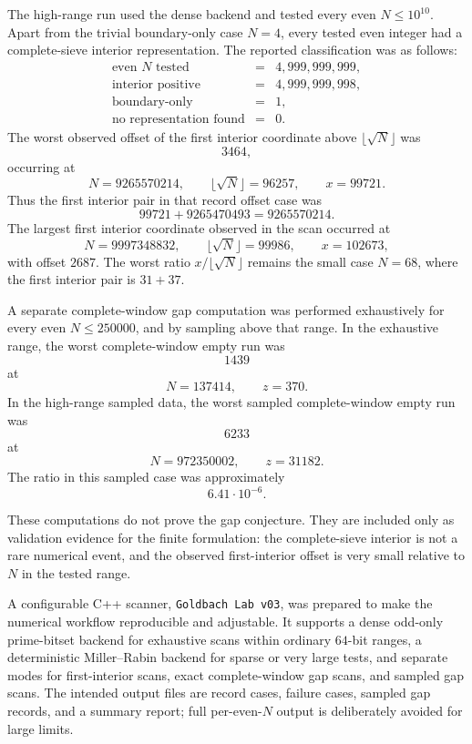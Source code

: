 \documentclass[11pt]{article}
\theoremstyle{plain}
\theoremstyle{definition}
\theoremstyle{remark}
\begin{document}
The high-range run used the dense backend and tested every even
\(N\le 10^{10}\).  Apart from the trivial boundary-only case \(N=4\), every
tested even integer had a complete-sieve interior representation.  The reported
classification was as follows:
\[
\begin{array}{rcl}
\text{even }N\text{ tested} &=& 4,999,999,999,\\
\text{interior positive} &=& 4,999,999,998,\\
\text{boundary-only} &=& 1,\\
\text{no representation found} &=& 0.
\end{array}
\]
The worst observed offset of the first interior coordinate above
\(\lfloor\sqrt N\rfloor\) was
\[
3464,
\]
occurring at
\[
N=9265570214,
\qquad
\lfloor\sqrt N\rfloor=96257,
\qquad
x=99721.
\]
Thus the first interior pair in that record offset case was
\[
99721+9265470493=9265570214.
\]
The largest first interior coordinate observed in the scan occurred at
\[
N=9997348832,
\qquad
\lfloor\sqrt N\rfloor=99986,
\qquad
x=102673,
\]
with offset \(2687\).  The worst ratio \(x/\lfloor\sqrt N\rfloor\) remains the
small case \(N=68\), where the first interior pair is \(31+37\).

A separate complete-window gap computation was performed exhaustively for every
even \(N\le250000\), and by sampling above that range.  In the exhaustive range,
the worst complete-window empty run was
\[
1439
\]
at
\[
N=137414,
\qquad z=370.
\]
In the high-range sampled data, the worst sampled complete-window empty run was
\[
6233
\]
at
\[
N=972350002,
\qquad z=31182.
\]
The ratio in this sampled case was approximately
\[
6.41\cdot 10^{-6}.
\]

These computations do not prove the gap conjecture.  They are included only as
validation evidence for the finite formulation: the complete-sieve interior is
not a rare numerical event, and the observed first-interior offset is very small
relative to \(N\) in the tested range.

A configurable C++ scanner, \texttt{Goldbach Lab v03}, was prepared to make the
numerical workflow reproducible and adjustable.  It supports a dense odd-only
prime-bitset backend for exhaustive scans within ordinary \(64\)-bit ranges, a
deterministic Miller--Rabin backend for sparse or very large tests, and separate
modes for first-interior scans, exact complete-window gap scans, and sampled gap
scans.  The intended output files are record cases, failure cases, sampled gap
records, and a summary report; full per-even-\(N\) output is deliberately avoided
for large limits.
\end{document}
